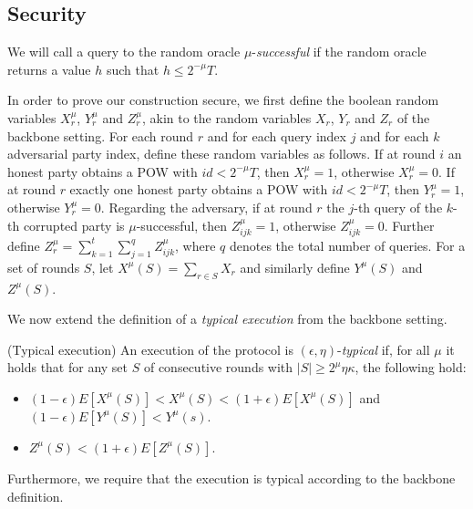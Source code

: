 \subsection{Security}

We will call a query to the random oracle $\mu$-\textit{successful} if the
random oracle returns a value $h$ such that $h \leq 2^{-\mu}T$.

In order to prove our construction secure, we first define the boolean random
variables $X_r^\mu$, $Y_r^\mu$ and $Z_r^\mu$, akin to the random variables
$X_r$, $Y_r$ and $Z_r$ of the backbone setting\cite{backbone}. For each round $r$ and for each
query index $j$ and for each $k$ adversarial party index, define these random
variables as follows.  If at round $i$ an honest party obtains a POW with $id <
2^{-\mu}T$, then $X_r^\mu = 1$, otherwise $X_r^\mu = 0$. If at round $r$
exactly one honest party obtains a POW with $id < 2^{-\mu}T$, then $Y_r^\mu =
1$, otherwise $Y_r^\mu = 0$. Regarding the adversary, if at round $r$ the
$j$-th query of the $k$-th corrupted party is $\mu$-successful, then $Z^\mu_{ijk} =
1$, otherwise $Z^\mu_{ijk} = 0$. Further define $Z^\mu_r = \sum_{k=1}^t
\sum_{j=1}^q Z^\mu_{ijk}$, where $q$ denotes the total number of queries. For a set
of rounds $S$, let $X^\mu(S) = \sum_{r \in S} X_r$ and similarly define
$Y^\mu(S)$ and $Z^\mu(S)$.

We now extend the definition of a \textit{typical execution} from the backbone
setting\cite{backbone}.

\begin{definition}{(Typical execution)}
    An execution of the protocol is $(\epsilon, \eta)$-\textit{typical} if, for
    all $\mu$ it holds that for any set $S$ of consecutive rounds with $|S| \geq
    2^\mu \eta\kappa$, the following hold:

    \begin{itemize}
        \item $(1 - \epsilon)E[X^\mu(S)] < X^\mu(S) < (1 + \epsilon)E[X^\mu(S)]$ and $(1 - \epsilon)E[Y^\mu(S)] < Y^\mu(s)$.
        \item $Z^\mu(S) < (1 + \epsilon)E[Z^\mu(S)]$.
    \end{itemize}

    Furthermore, we require that the execution is typical according to the
    backbone definition.
\end{definition}

